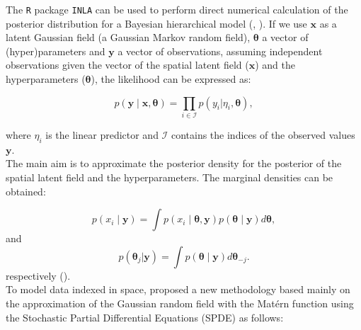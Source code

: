 \documentclass{article}
\begin{document}
\vspace{0.2cm}


The \texttt{R} package \texttt{INLA} can be used to perform direct numerical calculation of the posterior distribution for a Bayesian hierarchical model (\cite{rue2009approximate}, \cite{martino2009implementing}). If we use $\boldsymbol{x}$ as a latent Gaussian field (a Gaussian Markov random field), $\boldsymbol{\theta}$ a vector of (hyper)parameters and $\boldsymbol{y}$ a vector of observations, assuming independent observations given the vector of the spatial latent field ($\boldsymbol{x}$) and the hyperparameters ($\boldsymbol{\theta}$), the likelihood can be expressed as:

\begin{equation} \label{eqn:eq6}
p(\boldsymbol{y}\mid \boldsymbol{x},\boldsymbol{\theta}) =\prod_{i\in \mathcal{I}} p(y_i|\eta_i,\boldsymbol{\theta}),
\end{equation}

where $\eta_{i}$ is the linear predictor and $\mathcal{I}$ contains the indices of the observed values $\boldsymbol{y}$.  \\

The main aim is to approximate the posterior density for the posterior of the spatial latent field and the hyperparameters. The marginal densities can be obtained:

\begin{equation} \label{eqn:eq7}
p(x_i \mid \boldsymbol{y}) = \int p(x_i \mid \boldsymbol{\theta},\boldsymbol{y})  p(\boldsymbol{\theta} \mid \boldsymbol{y}) d\boldsymbol{\theta},
\end{equation}
and
\begin{equation} \label{eqn:eq8}
p(\boldsymbol{\theta}_j|\boldsymbol{y}) = \int p(\boldsymbol{\theta} \mid \boldsymbol{y})  d\boldsymbol{\theta}_{-j}.
\end{equation}
respectively (\cite{lindgren2015bayesian, krainski2018advanced}). \\


To model data indexed in space, \cite{lindgren2011explicit} proposed a new methodology based mainly on the approximation of the Gaussian random field with the Mat\'ern function using the Stochastic Partial Differential Equations (SPDE) as follows:
\end{document}
